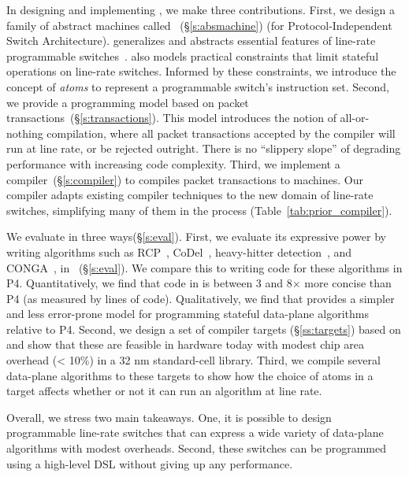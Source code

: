 In designing and implementing \pktlanguage, we make three contributions.
First, we design a family of abstract machines called
\absmachine~(\S\ref{s:absmachine}) (for Protocol-Independent Switch
Architecture). \absmachine generalizes and abstracts essential features of
line-rate programmable switches~\cite{rmt, xpliant, flexpipe}. \absmachine also
models practical constraints that limit stateful operations on line-rate
switches.  Informed by these constraints, we introduce the concept of {\em
atoms} to represent a programmable switch's instruction set.  Second, we
provide a programming model based on packet
transactions~(\S\ref{s:transactions}).  This model introduces the notion of
all-or-nothing compilation, where all packet transactions accepted by the
compiler will run at line rate, or be rejected outright. There is no ``slippery
slope'' of degrading performance with increasing code complexity.  Third, we
implement a compiler~(\S\ref{s:compiler}) to compiles packet transactions to
\absmachine machines. Our compiler adapts existing compiler techniques to the
new domain of line-rate switches, simplifying many of them in the process
(Table~\ref{tab:prior_compiler}).

We evaluate \pktlanguage in three ways(\S\ref{s:eval}). First, we evaluate its
expressive power by writing algorithms such as RCP~\cite{rcp},
CoDel~\cite{codel}, heavy-hitter detection~\cite{opensketch}, and
CONGA~\cite{conga}, in \pktlanguage~(\S\ref{s:eval}). We compare this to
writing code for these algorithms in P4. Quantitatively, we find that code in
\pktlanguage is between 3 and 8$\times$ more concise than P4 (as measured by
lines of code).  Qualitatively, we find that \pktlanguage provides a simpler
and less error-prone model for programming stateful data-plane algorithms
relative to P4.  Second, we design a set of compiler targets
(\S\ref{ss:targets}) based on \absmachine and show that these are feasible in
hardware today with modest chip area overhead (< 10\%) in a 32 nm standard-cell
library. Third, we compile several data-plane algorithms to these targets to
show how the choice of atoms in a target affects whether or not it can run an
algorithm at line rate.

Overall, we stress two main takeaways. One, it is possible to design
programmable line-rate switches that can express a wide variety of data-plane
algorithms with modest overheads. Second, these switches can be programmed
using a high-level DSL without giving up any performance.
